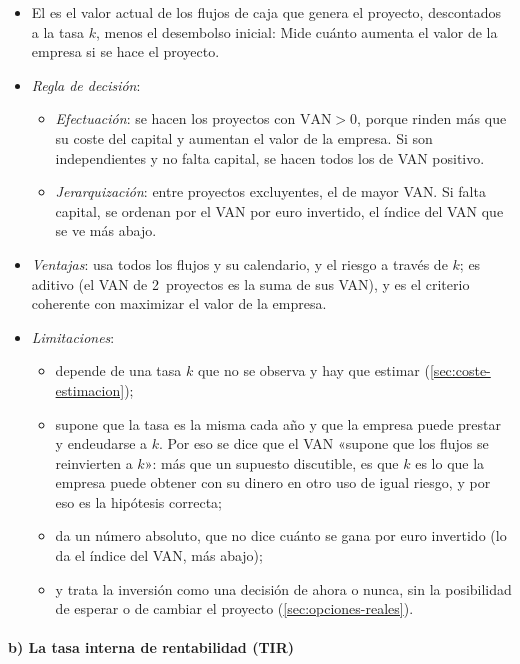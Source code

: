 \documentclass[11pt]{article}
\begin{document}
\begin{itemize}
\item El  es el valor actual de los flujos de caja que genera el proyecto, descontados a la tasa $k$, menos el desembolso inicial:
  Mide cuánto aumenta el valor de la empresa si se hace el proyecto.
\item \emph{Regla de decisión}:
  \begin{itemize}
  \item \emph{Efectuación}: se hacen los proyectos con $\mathrm{VAN}>0$, porque rinden más que su coste del capital y aumentan el valor de la empresa. Si son independientes y no falta capital, se hacen todos los de VAN positivo.
  \item \emph{Jerarquización}: entre proyectos excluyentes, el de mayor VAN. Si falta capital, se ordenan por el VAN por euro invertido, el índice del VAN que se ve más abajo.
  \end{itemize}
\item \emph{Ventajas}: usa todos los flujos y su calendario, y el riesgo a través de $k$; es aditivo (el VAN de 2~proyectos es la suma de sus VAN), y es el criterio coherente con maximizar el valor de la empresa\nocite{Hirshleifer1958Optimal}.
\item \emph{Limitaciones}:
  \begin{itemize}
  \item depende de una tasa $k$ que no se observa y hay que estimar (\ref{sec:coste-estimacion});
  \item supone que la tasa es la misma cada año y que la empresa puede prestar y endeudarse a $k$. Por eso se dice que el VAN «supone que los flujos se reinvierten a $k$»: más que un supuesto discutible, es que $k$ es lo que la empresa puede obtener con su dinero en otro uso de igual riesgo, y por eso es la hipótesis correcta;
  \item da un número absoluto, que no dice cuánto se gana por euro invertido (lo da el índice del VAN, más abajo);
  \item y trata la inversión como una decisión de ahora o nunca, sin la posibilidad de esperar o de cambiar el proyecto (\ref{sec:opciones-reales}).
  \end{itemize}
\end{itemize}

\paragraph{b) La tasa interna de rentabilidad (TIR)}
\end{document}
